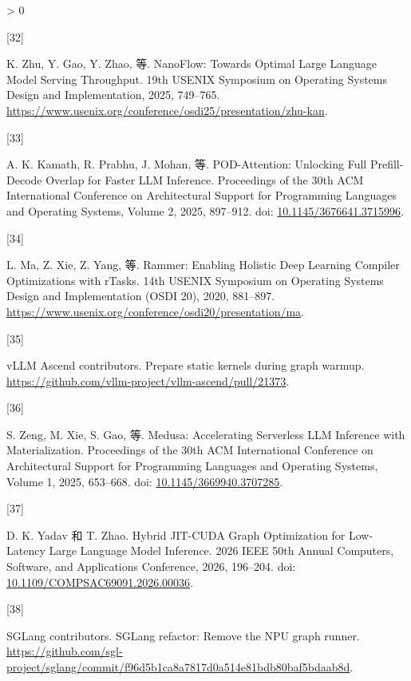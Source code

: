 \documentclass[
  UTF8,
  zihao=5]{ctexart}
\newlength{\cslhangindent}
\newlength{\csllabelwidth}
\newenvironment{CSLReferences}[2] %
 {%
  \setlength{\parindent}{0pt}
  \ifodd #1 \everypar{\setlength{\hangindent}{\cslhangindent}}\ignorespaces\fi
  \ifnum #2 > 0
  \setlength{\parskip}{#2\baselineskip}
  \fi
 }%
 {}
\newcommand{\CSLLeftMargin}[1]{\parbox[t]{\csllabelwidth}{#1}}
\newcommand{\CSLRightInline}[1]{\parbox[t]{\linewidth - \csllabelwidth}{#1}\par}
\begin{document}
\begin{CSLReferences}{0}{0}
\leavevmode{}%
\CSLLeftMargin{{[}32{]} }%
\CSLRightInline{K. Zhu, Y. Gao, Y. Zhao, 等. {NanoFlow: Towards Optimal
Large Language Model Serving Throughput}. 19th USENIX Symposium on
Operating Systems Design and Implementation, 2025, 749--765.
\url{https://www.usenix.org/conference/osdi25/presentation/zhu-kan}.}

\leavevmode{}%
\CSLLeftMargin{{[}33{]} }%
\CSLRightInline{A. K. Kamath, R. Prabhu, J. Mohan, 等. {POD-Attention:
Unlocking Full Prefill-Decode Overlap for Faster LLM Inference}.
Proceedings of the 30th ACM International Conference on Architectural
Support for Programming Languages and Operating Systems, Volume 2, 2025,
897--912. doi:
\href{https://doi.org/10.1145/3676641.3715996}{10.1145/3676641.3715996}.}

\leavevmode{}%
\CSLLeftMargin{{[}34{]} }%
\CSLRightInline{L. Ma, Z. Xie, Z. Yang, 等. Rammer: Enabling Holistic
Deep Learning Compiler Optimizations with rTasks. 14th USENIX Symposium
on Operating Systems Design and Implementation (OSDI 20), 2020,
881--897.
\url{https://www.usenix.org/conference/osdi20/presentation/ma}.}

\leavevmode{}%
\CSLLeftMargin{{[}35{]} }%
\CSLRightInline{vLLM Ascend contributors. {Prepare static kernels during
graph warmup}.
\url{https://github.com/vllm-project/vllm-ascend/pull/21373}.}

\leavevmode{}%
\CSLLeftMargin{{[}36{]} }%
\CSLRightInline{S. Zeng, M. Xie, S. Gao, 等. Medusa: Accelerating
Serverless LLM Inference with Materialization. Proceedings of the 30th
ACM International Conference on Architectural Support for Programming
Languages and Operating Systems, Volume 1, 2025, 653--668. doi:
\href{https://doi.org/10.1145/3669940.3707285}{10.1145/3669940.3707285}.}

\leavevmode{}%
\CSLLeftMargin{{[}37{]} }%
\CSLRightInline{D. K. Yadav 和 T. Zhao. {Hybrid JIT-CUDA Graph
Optimization for Low-Latency Large Language Model Inference}. 2026 IEEE
50th Annual Computers, Software, and Applications Conference, 2026,
196--204. doi:
\href{https://doi.org/10.1109/COMPSAC69091.2026.00036}{10.1109/COMPSAC69091.2026.00036}.}

\leavevmode{}%
\CSLLeftMargin{{[}38{]} }%
\CSLRightInline{SGLang contributors. {SGLang refactor: Remove the NPU
graph runner}.
\url{https://github.com/sgl-project/sglang/commit/f96d5b1ca8a7817d0a514e81bdb80baf5bdaab8d}.}


\end{CSLReferences}
\end{document}
